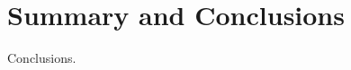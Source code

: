 \chapter[Summary and Conclusions]{Summary and Conclusions}
\label{chap:conclusions}


\clearpage

Conclusions.

\clearpage
{} %



